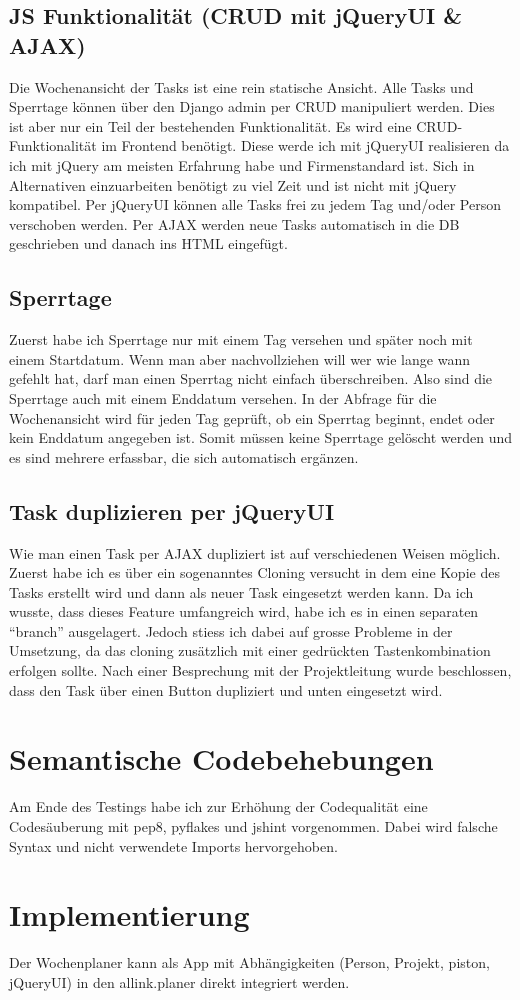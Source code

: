 \subsection{JS Funktionalität (CRUD mit jQueryUI \& AJAX) }
Die Wochenansicht der Tasks ist eine rein statische Ansicht.
Alle Tasks und Sperrtage können über den Django admin per CRUD manipuliert werden. Dies ist aber nur ein Teil der bestehenden Funktionalität.
Es wird eine CRUD-Funktionalität im Frontend benötigt. Diese werde ich mit jQueryUI realisieren da ich mit jQuery am meisten Erfahrung habe und Firmenstandard ist.
Sich in Alternativen einzuarbeiten benötigt zu viel Zeit und ist nicht mit jQuery kompatibel.
Per jQueryUI können alle Tasks frei zu jedem Tag und/oder Person verschoben werden.
Per AJAX werden neue Tasks automatisch in die DB geschrieben und danach ins HTML eingefügt.
\subsection{Sperrtage}
Zuerst habe ich Sperrtage nur mit einem Tag versehen und später noch mit einem Startdatum.
Wenn man aber nachvollziehen will wer wie lange wann gefehlt hat, darf man einen Sperrtag nicht einfach überschreiben.
Also sind die Sperrtage auch mit einem Enddatum versehen. In der Abfrage für die Wochenansicht wird für jeden Tag geprüft,
ob ein Sperrtag beginnt, endet oder kein Enddatum angegeben ist.
Somit müssen keine Sperrtage gelöscht werden und es sind mehrere erfassbar, die sich automatisch ergänzen.
\subsection{Task duplizieren per jQueryUI}
Wie man einen Task per AJAX dupliziert ist auf verschiedenen Weisen möglich.\\
Zuerst habe ich es über ein sogenanntes Cloning versucht in dem eine Kopie des Tasks erstellt wird und dann als neuer Task eingesetzt werden kann.
Da ich wusste, dass dieses Feature umfangreich wird, habe ich es in einen separaten ``branch'' ausgelagert.
Jedoch stiess ich dabei auf grosse Probleme in der Umsetzung, da das cloning zusätzlich mit einer gedrückten Tastenkombination erfolgen sollte.
Nach einer Besprechung mit der Projektleitung wurde beschlossen, dass den Task über einen Button dupliziert und unten eingesetzt wird.
\section{Semantische Codebehebungen}
Am Ende des Testings habe ich zur Erhöhung der Codequalität eine Codesäuberung mit pep8, pyflakes und jshint vorgenommen. Dabei wird falsche Syntax und
nicht verwendete Imports hervorgehoben.
\section{Implementierung}
Der Wochenplaner kann als App mit Abhängigkeiten (Person, Projekt, piston, jQueryUI) in den allink.planer direkt integriert werden.
